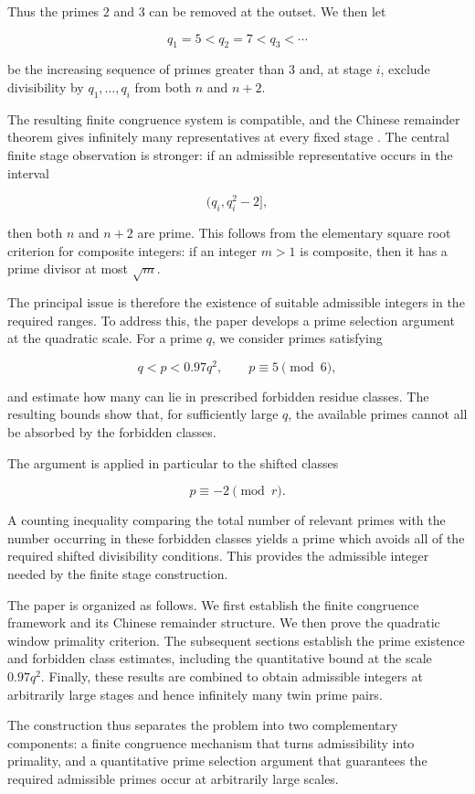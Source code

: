 \documentclass[11pt,a4paper]{article}
\theoremstyle{definition}
\theoremstyle{remark}
\begin{document}
Thus the primes $2$ and $3$ can be removed at the outset.  We then let

$$
q_1=5<q_2=7<q_3<\cdots
$$

be the increasing sequence of primes greater than $3$ and, at stage
$i$, exclude divisibility by $q_1,\ldots,q_i$ from both $n$ and
$n+2$.

The resulting finite congruence system is compatible, and the Chinese
remainder theorem gives infinitely many representatives at every fixed
stage \cite{nivenZuckermanMontgomery}.  The central finite stage
observation is stronger: if an admissible representative occurs in the
interval

$$
(q_i,q_i^2-2],
$$

then both $n$ and $n+2$ are prime.  This follows from the elementary
square root criterion for composite integers: if an integer $m>1$ is
composite, then it has a prime divisor at most $\sqrt{m}$.

The principal issue is therefore the existence of suitable admissible
integers in the required ranges.  To address this, the paper develops a
prime selection argument at the quadratic scale.  For a prime $q$,
we consider primes satisfying

$$
q<p<0.97q^2,
\qquad
p\equiv5\pmod6,
$$

and estimate how many can lie in prescribed forbidden residue classes.
The resulting bounds show that, for sufficiently large $q$, the
available primes cannot all be absorbed by the forbidden classes.

The argument is applied in particular to the shifted classes

$$
p\equiv-2\pmod r.
$$

A counting inequality comparing the total number of relevant primes
with the number occurring in these forbidden classes yields a prime
which avoids all of the required shifted divisibility conditions.  This
provides the admissible integer needed by the finite stage construction.

The paper is organized as follows.  We first establish the finite
congruence framework and its Chinese remainder structure.  We then
prove the quadratic window primality criterion.  The subsequent
sections establish the prime existence and forbidden class estimates,
including the quantitative bound at the scale $0.97q^2$.  Finally, these
results are combined to obtain admissible integers at arbitrarily
large stages and hence infinitely many twin prime pairs.

The construction thus separates the problem into two complementary
components: a finite congruence mechanism that turns admissibility into
primality, and a quantitative prime selection argument that guarantees
the required admissible primes occur at arbitrarily large scales.
\end{document}
